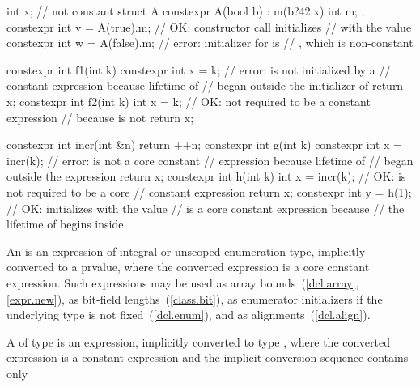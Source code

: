 \enterexample
\begin{codeblock}
int x;                              // not constant
struct A {
  constexpr A(bool b) : m(b?42:x) { }
  int m;
};
constexpr int v = A(true).m;        // OK: constructor call initializes
                                    //  with the value 
constexpr int w = A(false).m;       // error: initializer for  is
                                    // , which is non-constant

constexpr int f1(int k) {
  constexpr int x = k;              // error:  is not initialized by a
                                    // constant expression because lifetime of 
                                    // began outside the initializer of 
  return x;
}
constexpr int f2(int k) {
  int x = k;                        // OK: not required to be a constant expression
                                    // because  is not 
  return x;
}

constexpr int incr(int &n) {
  return ++n;
}
constexpr int g(int k) {
  constexpr int x = incr(k);        // error:  is not a core constant
                                    // expression because lifetime of 
                                    // began outside the expression 
  return x;
}
constexpr int h(int k) {
  int x = incr(k);                  // OK:  is not required to be a core
                                    // constant expression
  return x;
}
constexpr int y = h(1);             // OK: initializes  with the value 
                                    //  is a core constant expression because
                                    // the lifetime of  begins inside 
\end{codeblock}
\exitexample

\pnum
An  is an expression of integral or
unscoped enumeration type, implicitly converted to a prvalue, where the converted expression is a core constant expression.
\enternote
Such expressions may be
used as array bounds~(\ref{dcl.array}, \ref{expr.new}),
as bit-field lengths~(\ref{class.bit}), as enumerator
initializers if the underlying type is not fixed~(\ref{dcl.enum}),
and as alignments~(\ref{dcl.align}).
\exitnote

\pnum
A  of type  is an
expression, implicitly converted to type , where
the converted expression is a constant expression and the
implicit conversion sequence contains only

